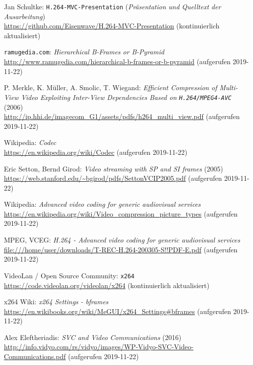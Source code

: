 
\begin{thebibliography}{10}

Jan Schultke:
\texttt{H.264-MVC-Presentation} (\textit{Pr\"asentation und Quelltext der Ausarbeitung})
\\\url{https://github.com/Eisenwave/H.264-MVC-Presentation}
(kontinuierlich aktualisiert)

\texttt{ramugedia.com}:
\textit{Hierarchical B-Frames or B-Pyramid}
\\\url{http://www.ramugedia.com/hierarchical-b-frames-or-b-pyramid}
(aufgerufen 2019-11-22)

P. Merkle, K. M\"uller, A. Smolic, T. Wiegand:
\textit{Efficient Compression of Multi-View Video Exploiting Inter-View Dependencies Based on \texttt{H.264/MPEG4-AVC}} (2006)
\\\url{http://ip.hhi.de/imagecom_G1/assets/pdfs/h264_multi_view.pdf}
(aufgerufen 2019-11-22)

Wikipedia:
\textit{Codec}
\\\url{https://en.wikipedia.org/wiki/Codec}
(aufgerufen 2019-11-22)

Eric Setton, Bernd Girod:
\textit{Video streaming with SP and SI frames} (2005)
\\\url{https://web.stanford.edu/~bgirod/pdfs/SettonVCIP2005.pdf}
(aufgerufen 2019-11-22)

Wikipedia:
\textit{Advanced video coding for generic audiovisual services}
\\\url{https://en.wikipedia.org/wiki/Video_compression_picture_types}
(aufgerufen 2019-11-22)

MPEG, VCEG:
\textit{H.264 - Advanced video coding for generic audiovisual services}
\\\url{file:///home/user/downloads/T-REC-H.264-200305-S!!PDF-E.pdf}
(aufgerufen 2019-11-22)

VideoLan / Open Source Community:
\texttt{x264}
\url{https://code.videolan.org/videolan/x264}
(kontinuierlich aktualisiert)

x264 Wiki:
\textit{x264 Settings - bframes}
\\\url{https://en.wikibooks.org/wiki/MeGUI/x264_Settings#bframes}
(aufgerufen 2019-11-22)

Alex Eleftheriadis:
\textit{SVC and Video Communications} (2016)
\\\url{http://info.vidyo.com/rs/vidyo/images/WP-Vidyo-SVC-Video-Communications.pdf}
(aufgerufen 2019-11-22)


\end{thebibliography}
